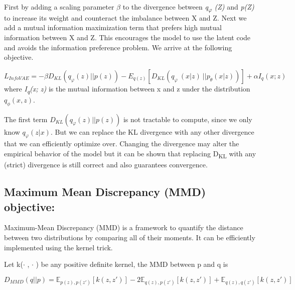 \documentclass[12pt,a4paper]{article}
\begin{document}
First by adding a scaling parameter  \(  \beta  \) to the divergence between \textit{q\textsubscript{$ \varphi $ }(Z)} and \textit{p(Z)} to increase its weight and counteract the imbalance between X and Z. Next we add a mutual information maximization term that prefers high mutual information between X and Z. This encourages the model to use the latent code and avoids the information preference problem. We arrive at the following objective.\par
\begin{equation}
 L_{InfoVAE} = - \beta D_{KL}(q_{\varphi } ( z ) \vert \vert p(z))- E _{q ( z ) } [ D_{KL}( q _{ \varphi }~ ( x \vert z ) ~\vert \vert p_{ \theta } ( x \vert z ) )]+ \alpha I_{q} ( x; z )
\end{equation}
where \textit{I\textsubscript{q}(x; z)} is the mutual information between x and z under the distribution $q_\phi(x, z)$.\par
\vspace{\baselineskip}
The first term $D_{KL}( q_\varphi( z)\vert\vert p(z))$ is not tractable to compute, since we only know  $ q_{\varphi}(z\vert x)$. But we can replace the KL divergence with any other divergence that we can efficiently optimize over. Changing the divergence may alter the empirical behavior of the model but it can be shown that replacing D\textsubscript{KL }with any (strict) divergence is still correct and also guarantees convergence.\par

\subsection{Maximum Mean Discrepancy (MMD) objective:}
Maximum-Mean Discrepancy (MMD) is a framework to quantify the distance between two distributions by comparing all of their moments. It can be efficiently implemented using the kernel trick.\par
Let k($ \cdot $ , $ \cdot $ ) be any positive definite kernel, the MMD between p and q is\par
\begin{equation}
     D_{MMD}(q\vert \vert p ) =  \mathbb{E} _{p ( z ) ,p ( z' ) } [ k ( z, z' ) ] - 2 \mathbb{E} _{q ( z ) ,p ( z' ) } [ k ( z, z' ) ] +  \mathbb{E} _{q ( z ) ,q ( z' ) } [ k ( z, z' ) ]
\end{equation}
\end{document}

